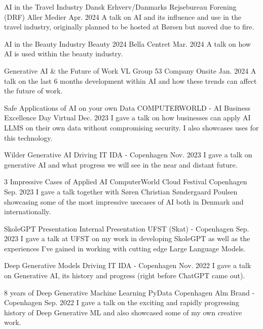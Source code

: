 \begin{cventries}
    \cventry
    {AI in the Travel Industry} %
    {Dansk Erhverv/Danmarks Rejsebureau Forening (DRF)} %
    {Aller Medier} %
    {Apr. 2024} %
    {
      A talk on AI and its influence and use in the travel industry, originally planned to be hosted at Børsen but moved due to fire.
    }

    \cventry
    {AI in the Beauty Industry} %
    {Beauty 2024} %
    {Bella Centret} %
    {Mar. 2024} %
    {
      A talk on how AI is used within the beauty industry.
    }

    \cventry
    {Generative AI \& the Future of Work} %
    {VL Group 53} %
    {Company Onsite} %
    {Jan. 2024} %
    {
      A talk on the last 6 months development within AI and how these trends can affect the future of work.
    }


    \cventry
    {Safe Applications of AI on your own Data} %
    {COMPUTERWORLD - AI Business Excellence Day} %
    {Virtual} %
    {Dec. 2023} %
    {
      I gave a talk on how businesses can apply AI LLMS on their own data without compromising security. I also showcases uses for this technology.
    }

    \cventry
    {Wilder Generative AI} %
    {Driving IT} %
    {IDA - Copenhagen} %
    {Nov. 2023} %
    {
      I gave a talk on generative AI and what progress we will see in the near and distant future.
    }

    \cventry
    {3 Impressive Cases of Applied AI} %
    {ComputerWorld Cloud Festival} %
    {Copenhagen} %
    {Sep. 2023} %
    {
      I gave a talk together with Søren Christian Søndergaard Poulsen showcasing some of the most impressive usecases of AI both in Denmark and internationally.
    }

    \cventry
    {SkoleGPT Presentation} %
    {Internal Presentation} %
    {UFST (Skat) - Copenhagen} %
    {Sep. 2023} %
    {
      I gave a talk at UFST on my work in developing SkoleGPT as well as the experiences I've gained in working with cutting edge Large Language Models.
    }

    \cventry
    {Deep Generative Models} %
    {Driving IT} %
    {IDA - Copenhagen} %
    {Nov. 2022} %
    {
      I gave a talk on Generative AI, its history and progress (right before ChatGPT came out).
    }

    \cventry
    {8 years of Deep Generative Machine Learning} %
    {PyData Copenhagen} %
    {Alm Brand - Copenhagen} %
    {Sep. 2022} %
    {
      I gave a talk on the exciting and rapidly progressing history of Deep Generative ML and also showcased some of my own creative work.
    }


\end{cventries}